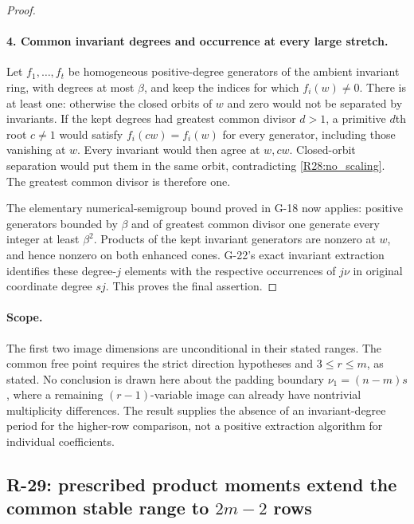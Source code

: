 \begin{proof}
\paragraph{4. Common invariant degrees and occurrence at every large stretch.}
Let $f_1,\ldots,f_t$ be homogeneous positive-degree generators
of the ambient invariant ring, with degrees at most $\beta$,
and keep the indices for which $f_i(w)\ne0$. There is at least
one: otherwise the closed orbits of $w$ and zero would not
be separated by invariants. If the kept degrees had greatest
common divisor $d>1$, a primitive $d$th root $c\ne1$ would
satisfy $f_i(cw)=f_i(w)$ for every generator, including those
vanishing at $w$. Every invariant would then agree at $w,cw$.
Closed-orbit separation would put them in the same orbit,
contradicting \eqref{R28:no_scaling}. The greatest common
divisor is therefore one.

The elementary numerical-semigroup bound proved in G-18
now applies: positive generators bounded by $\beta$ and of
greatest common divisor one generate every integer at least
$\beta^2$. Products of the kept invariant generators are
nonzero at $w$, and hence nonzero on both enhanced cones.
G-22's exact invariant extraction identifies these degree-$j$
elements with the respective occurrences of $j\nu$ in original
coordinate degree $sj$. This proves the final assertion.
\end{proof}

\paragraph{Scope.}
The first two image dimensions are unconditional in their
stated ranges. The common free point requires the strict
direction hypotheses and $3\leq r\leq m$, as stated.
No conclusion is drawn here about the padding boundary
$\nu_1=(n-m)s$, where a remaining $(r-1)$-variable image can
already have nontrivial multiplicity differences. The result
supplies the absence of an invariant-degree period for the
higher-row comparison, not a positive extraction algorithm
for individual coefficients.


\subsection{R-29: prescribed product moments extend the common stable range to $2m-2$ rows}

